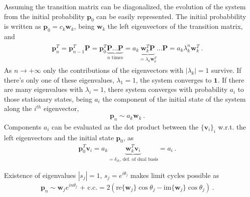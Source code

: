 \documentclass[letterpaper,10pt,english]{jupyterBook}
\begin{document}
\sphinxAtStartPar
Assuming the transition matrix can be diagonalized, the evolution of the system from the initial probability \(\mathbf{p}_0\) can be easily represented. The initial probabbility is written as \(\mathbf{p}_0 = c_k \mathbf{w}_k\), being \(\mathbf{w}_k\) the left eigenvectors of the transition matrix, and
\begin{equation*}
\begin{split}\begin{aligned}
  \mathbf{p}^T_n
  =\mathbf{p}^T_{n-1} \mathbf{P}
  =\mathbf{p}^T_{0} \underbrace{\mathbf{P} \dots \mathbf{P}}_{ n \text{ times} }
  =a_k \underbrace{\mathbf{w}^T_k \mathbf{P}}_{= \lambda_k \mathbf{w}_k^T} \dots \mathbf{P}
  =a_k \lambda_k^n \mathbf{w}_k^T \ .
\end{aligned}\end{split}
\end{equation*}
\sphinxAtStartPar
As \(n \rightarrow +\infty\) only the contributions of the eigenvectors with \(|\lambda_k| = 1\) survive. If there’s only one of these eigenvalues, \(\lambda_1 = 1\), the system converges to \(\mathbf{1}\). If there are many eigenvalues with \(\lambda_i = 1\), there system converges with probability \(a_i\) to those stationary states, being \(a_i\) the component of the initial state of the system along the \(i^{th}\) eigenvector,
\begin{equation*}
\begin{split}\mathbf{p}_n \sim a_k \mathbf{w}_k \ .\end{split}
\end{equation*}
\sphinxAtStartPar
Components \(a_i\) can be evaluated as the dot product between the  \(\{ \mathbf{v}_i \}_i\) w.r.t. the left eigenvectors and the initial state \(\mathbf{p}_0\), as
\begin{equation*}
\begin{split} \mathbf{p}_0^T \mathbf{v}_i = a_k \underbrace{\mathbf{w}_k^T \mathbf{v}_i}_{ = \delta_{ik} \text{, def. of dual basis} } = a_i \ . \end{split}
\end{equation*}


\sphinxAtStartPar
Existence of eigenvalues \(|s_j| = 1\), \(s_j = e^{i \theta_j}\) makes limit cycles possible as
\begin{equation*}
\begin{split}\mathbf{p}_n \sim \mathbf{w}_j e^{i n \theta_j} \text{ + c.c.} = 2 \left( \text{re}\{ \mathbf{w}_j \} \cos \theta_j - \text{im}\{ \mathbf{w}_j \} \cos \theta_j \right) \ .\end{split}
\end{equation*}
\sphinxAtStartPar
{} 
\end{document}
